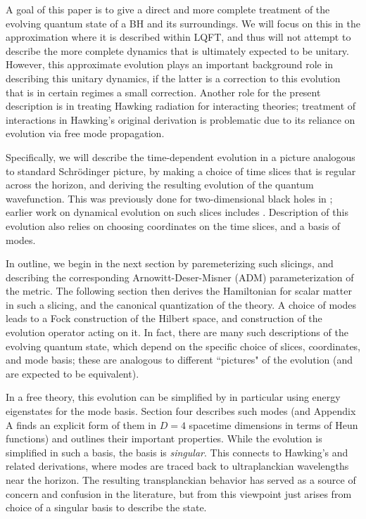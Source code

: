 \documentclass[12pt]{article}
\numberwithin{equation}{section}
\begin{document}
A goal of this paper is to give a direct and more complete treatment of the evolving quantum state of a BH and its surroundings.  We will focus on this in the approximation where it is described within LQFT, and thus will not attempt to describe the more complete dynamics that is ultimately expected to be unitary.  However, this approximate evolution plays an important background role in describing this unitary dynamics, if the latter is a correction to this evolution that is in certain regimes a small correction.  Another role for the present description is in treating Hawking radiation for interacting theories; treatment of interactions in Hawking's original derivation is problematic due to its reliance on evolution via free mode propagation.

Specifically, we will describe the time-dependent evolution in a picture analogous to standard Schr\"odinger picture, by making a choice of time slices that is regular across the horizon, and deriving the resulting evolution of the quantum wavefunction.  This was previously done for two-dimensional black holes in \cite{SEHS,SE2d}; earlier work on dynamical evolution on such slices includes \cite{MeWe1,MeWe2,BHS,HoSi}.  
  Description of this evolution also relies on choosing coordinates on the time slices, and a basis of modes.

In outline, we begin in the next section by paremeterizing such slicings, and describing the corresponding Arnowitt-Deser-Misner (ADM)  parameterization of the metric.  The following section then derives the Hamiltonian for scalar matter in such a slicing, and the canonical quantization of the theory.  A choice of modes  leads to a Fock construction of the Hilbert space, and construction of the evolution operator acting on it.   In fact, there are many such descriptions of the evolving quantum state, which depend on the specific choice of slices, coordinates, and mode basis; these are analogous to different ``pictures" of the evolution (and are expected to be equivalent).  

In a free theory, this evolution can be simplified by in particular using energy eigenstates for the mode basis.  Section four describes such modes (and Appendix A finds an explicit form of them in $D=4$ spacetime dimensions in terms of Heun functions) and outlines their important properties.  While the evolution is simplified in such a basis, the basis is {\it singular}.  This connects to Hawking's and related derivations, where modes are traced back to ultraplanckian wavelengths near the horizon.  The resulting transplanckian behavior has served as a source of concern and confusion in the literature, but from this viewpoint just arises from choice of  a singular basis to describe the state.
\end{document}
